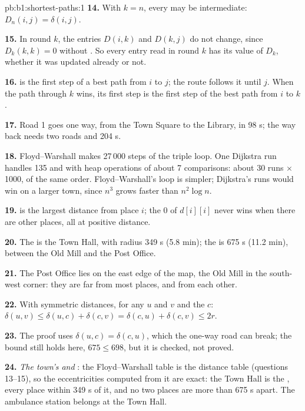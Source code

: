 \begin{solution}{pb:b1:shortest-paths:1}
\textbf{14.} With $k = n$, every  may be intermediate: $D_n(i, j) = \delta(i, j)$.

\textbf{15.} In round $k$, the entries $D(i, k)$ and $D(k, j)$ do not change, since $D_k(k, k) = 0$ without . So every entry read in round $k$ has its value of $D_k$, whether it was updated already or not.

\textbf{16.}  is the first step of a best path from $i$ to $j$; the route follows it until $j$. When the
path through $k$ wins, its first step is the first step of the best path from $i$ to $k$.

\textbf{17.} Road 1 goes one way, from the Town Square to the Library, in 98 s; the way back needs two roads and 204 s.

\textbf{18.} Floyd--Warshall makes 27\,000 steps of the triple loop. One Dijkstra run handles 135  and  with
heap operations of about 7 comparisons: about 30 runs $\times$ 1000, of the same order. Floyd--Warshall's loop is
simpler; Dijkstra's runs would win on a larger town, since $n^3$ grows faster than $n^2 \log n$.

\textbf{19.}  is the largest distance from place $i$; the 0 of $d[i][i]$ never wins when there are other
places, all at positive distance.

\textbf{20.} The  is the Town Hall, with radius 349 s (5.8 min); the  is 675 s (11.2 min), between the Old
Mill and the Post Office.

\textbf{21.} The Post Office lies on the east edge of the map, the Old Mill in the south-west corner: they are far from
most places, and from each other.

\textbf{22.} With symmetric distances, for any $u$ and $v$ and the  $c$: $\delta(u, v) \leq \delta(u, c) +
\delta(c, v) = \delta(c, u) + \delta(c, v) \leq 2r$.

\textbf{23.} The proof uses $\delta(u, c) = \delta(c, u)$, which the one-way road can break; the bound still holds here,
$675 \leq 698$, but it is checked, not proved.

\textbf{24.} \emph{The town's  and }: the Floyd--Warshall table is the distance table (questions 13--15),
so the eccentricities computed from it are exact: the Town Hall is the , every place within 349 s of it, and no
two places are more than 675 s apart. The ambulance station belongs at the Town Hall.
\end{solution}
